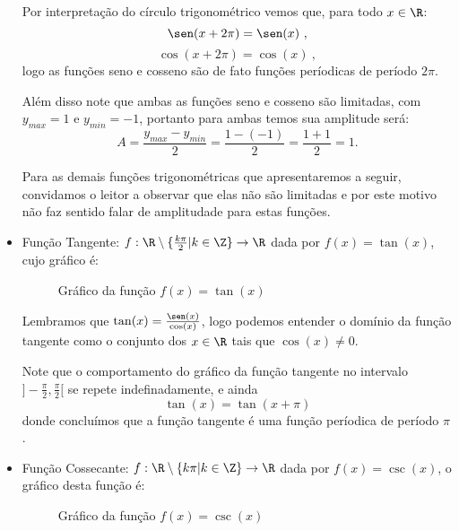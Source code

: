 \begin{itemize}
  Por interpretação do círculo trigonométrico vemos que, para todo $x \in \R$:
\begin{equation}
\sen(x + 2 \pi)= \sen(x) \ ,
\end{equation}
\begin{equation}
\cos(x + 2\pi)= \cos(x) \ , 
\end{equation}
  logo as funções seno e cosseno são de fato funções períodicas de período $2\pi$.
  
  Além disso note que ambas as funções seno e cosseno são limitadas, com $y_{max}= 1$ e $y_{min}= -1$, portanto para ambas temos sua amplitude será:
  \begin{equation}
  A= \frac{y_{max} - y_{min}}{2}= \frac{1 - (-1)}{2}= \frac{1+1}{2}= 1.
  \end{equation}
  
  Para as demais funções trigonométricas que apresentaremos a seguir, convidamos o leitor a observar que elas não são limitadas e por este motivo não faz sentido falar de amplitudade para estas funções.

  \item Função Tangente: $f: \R \setminus \{\frac{k\pi}{2} | k \in \Z\} \rightarrow \R$ dada por $f(x)= \tan(x)$, cujo gráfico é:

  \begin{figure}[H]
  \centering
    \caption{Gráfico da função $f(x)= \tan (x)$}
  \end{figure}

  Lembramos que $\tan(x)= \frac{\sen(x)}{\cos(x)}$, logo podemos entender o domínio da função tangente como o conjunto dos $x \in \R$ tais que $\cos(x) \neq 0$.

  Note que o comportamento do gráfico da função tangente no intervalo $]-\frac{\pi}{2}, \frac{\pi}{2}[$ se repete indefinadamente, e ainda
\begin{equation}
\tan(x)= \tan(x + \pi)
\end{equation}
  donde concluímos que a função tangente é uma função períodica de período $\pi$.

  \item Função Cossecante: $f: \R \setminus \{ k\pi | k \in \Z\} \rightarrow \R$ dada por $f(x)= \csc(x)$, o gráfico desta função é:

  \begin{figure}[H]
  \centering
    \caption{Gráfico da função $f(x)= \csc(x)$}
  \end{figure}


\end{itemize}

